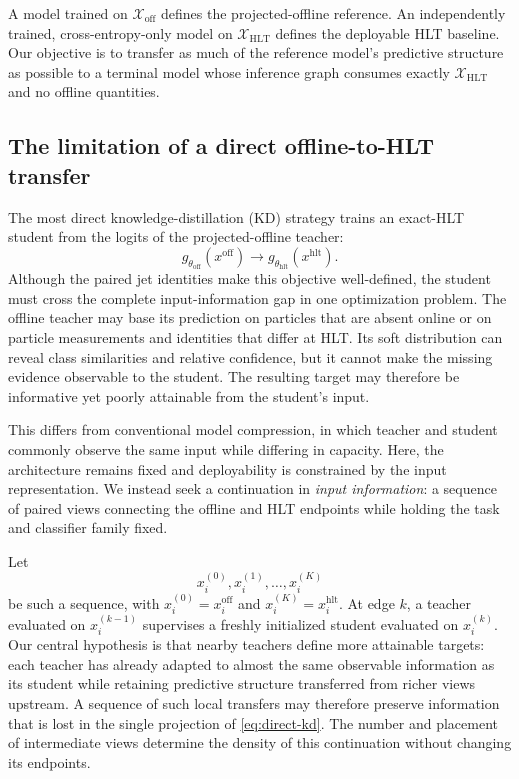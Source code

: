 \documentclass[11pt]{article}
\newcommand{\xoff}{\mathcal{X}_{\mathrm{off}}}
\newcommand{\xhlt}{\mathcal{X}_{\mathrm{HLT}}}
\begin{document}
A model trained on $\xoff$ defines the projected-offline reference.  An
independently trained, cross-entropy-only model on $\xhlt$ defines the
deployable HLT baseline.  Our objective is to transfer as much of the
reference model's predictive structure as possible to a terminal model whose
inference graph consumes exactly $\xhlt$ and no offline quantities.

\subsection{The limitation of a direct offline-to-HLT transfer}

The most direct knowledge-distillation (KD) strategy trains an exact-HLT
student from the logits of the projected-offline teacher:
\begin{equation}
    g_{\theta_{\mathrm{off}}}(x^{\mathrm{off}})
    \longrightarrow
    g_{\theta_{\mathrm{hlt}}}(x^{\mathrm{hlt}}).
    \label{eq:direct-kd}
\end{equation}
Although the paired jet identities make this objective well-defined, the
student must cross the complete input-information gap in one optimization
problem.  The offline teacher may base its prediction on particles that are
absent online or on particle measurements and identities that differ at HLT.
Its soft distribution can reveal class similarities and relative confidence,
but it cannot make the missing evidence observable to the student.  The
resulting target may therefore be informative yet poorly attainable from the
student's input.

This differs from conventional model compression, in which teacher and
student commonly observe the same input while differing in capacity.  Here,
the architecture remains fixed and deployability is constrained by the input
representation.  We instead seek a continuation in \emph{input information}:
a sequence of paired views connecting the offline and HLT endpoints while
holding the task and classifier family fixed.

Let
\begin{equation}
    x_i^{(0)},x_i^{(1)},\ldots,x_i^{(K)}
    \label{eq:view-sequence}
\end{equation}
be such a sequence, with $x_i^{(0)}=x_i^{\mathrm{off}}$ and
$x_i^{(K)}=x_i^{\mathrm{hlt}}$.  At edge $k$, a teacher evaluated on
$x_i^{(k-1)}$ supervises a freshly initialized student evaluated on
$x_i^{(k)}$.  Our central hypothesis is that nearby teachers define more
attainable targets: each teacher has already adapted to almost the same
observable information as its student while retaining predictive structure
transferred from richer views upstream.  A sequence of such local transfers
may therefore preserve information that is lost in the single projection of
\cref{eq:direct-kd}.  The number and placement of intermediate views determine
the density of this continuation without changing its endpoints.
\end{document}
